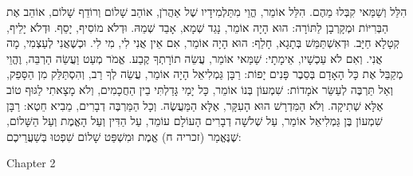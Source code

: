 הִלֵּל וְשַׁמַּאי קִבְּלוּ מֵהֶם. הִלֵּל אוֹמֵר, הֱוֵי מִתַּלְמִידָיו שֶׁל אַהֲרֹן, אוֹהֵב שָׁלוֹם וְרוֹדֵף שָׁלוֹם, אוֹהֵב אֶת הַבְּרִיּוֹת וּמְקָרְבָן לַתּוֹרָה:
הוּא הָיָה אוֹמֵר, נָגֵד שְׁמָא, אָבֵד שְׁמֵהּ. וּדְלֹא מוֹסִיף, יָסֵף. וּדְלֹא יָלֵיף, קְטָלָא חַיָּב. וּדְאִשְׁתַּמֵּשׁ בְּתָגָא, חָלֵף:
הוּא הָיָה אוֹמֵר, אִם אֵין אֲנִי לִי, מִי לִי. וּכְשֶׁאֲנִי לְעַצְמִי, מָה אֲנִי. וְאִם לֹא עַכְשָׁיו, אֵימָתָי:
שַׁמַּאי אוֹמֵר, עֲשֵׂה תוֹרָתְךָ קֶבַע. אֱמֹר מְעַט וַעֲשֵׂה הַרְבֵּה, וֶהֱוֵי מְקַבֵּל אֶת כָּל הָאָדָם בְּסֵבֶר פָּנִים יָפוֹת:
רַבָּן גַּמְלִיאֵל הָיָה אוֹמֵר, עֲשֵׂה לְךָ רַב, וְהִסְתַּלֵּק מִן הַסָּפֵק, וְאַל תַּרְבֶּה לְעַשֵּׂר אֹמָדוֹת:
שִׁמְעוֹן בְּנוֹ אוֹמֵר, כָּל יָמַי גָּדַלְתִּי בֵין הַחֲכָמִים, וְלֹא מָצָאתִי לַגּוּף טוֹב אֶלָּא שְׁתִיקָה. וְלֹא הַמִּדְרָשׁ הוּא הָעִקָּר, אֶלָּא הַמַּעֲשֶׂה. וְכָל הַמַּרְבֶּה דְבָרִים, מֵבִיא חֵטְא:
רַבָּן שִׁמְעוֹן בֶּן גַּמְלִיאֵל אוֹמֵר, עַל שְׁלשָׁה דְבָרִים הָעוֹלָם עוֹמֵד, עַל הַדִּין וְעַל הָאֱמֶת וְעַל הַשָּׁלוֹם, שֶׁנֶּאֱמַר (זכריה ח) אֱמֶת וּמִשְׁפַּט שָׁלוֹם שִׁפְטוּ בְּשַׁעֲרֵיכֶם:

Chapter 2

